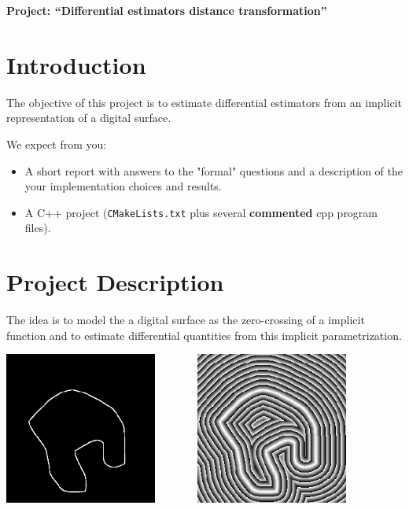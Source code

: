 \documentclass[a4paper, 11pt]{article}
\title{}
\author{}
\date{}
\begin{document}
\begin{center}
	\LARGE \textbf{Project: ``Differential estimators distance transformation''}
\end{center}

\section*{Introduction} 

The objective of this project is to estimate differential estimators
from an implicit representation of a digital surface.

We expect from you:
\begin{itemize}
\item A short report with answers to the "formal" questions and a
  description of the your implementation choices and results.
\item A C++ project (\texttt{CMakeLists.txt} plus several
  \textbf{commented} cpp program files).
\end{itemize}


\section{Project Description}


The idea is to model the a digital surface as the zero-crossing of a
implicit function and to estimate differential quantities from this
implicit parametrization.

\begin{center}
  \includegraphics[width=5cm]{images/contour.png}~~~~~~~
  \includegraphics[width=5cm]{images/contour_circ.png} 
\end{center}
\end{document}
